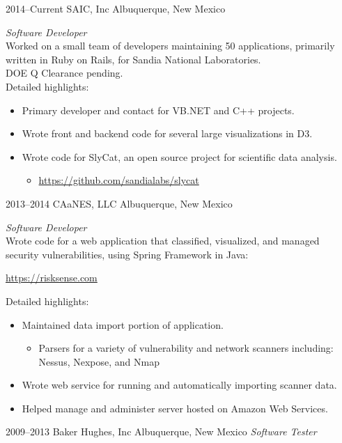 \documentclass[]{friggeri-cv} %
\begin{document}
\begin{entrylist}
\entry
{2014--Current}
{SAIC, Inc}
{Albuquerque, New Mexico}
{\emph{Software Developer} \\
Worked on a small team of developers maintaining 50 applications, primarily written in Ruby on Rails, for Sandia National Laboratories.\\
DOE Q Clearance pending. \\
Detailed highlights:
\begin{itemize}
\item Primary developer and contact for VB.NET and C++ projects.
\item Wrote front and backend code for several large visualizations in D3.
\item Wrote code for SlyCat, an open source project for scientific data analysis.
\begin{itemize}
		\item \href{https://github.com/sandialabs/slycat}{https://github.com/sandialabs/slycat}
\end{itemize}
\end{itemize}
}
\entry
{2013--2014}
{CAaNES, LLC}
{Albuquerque, New Mexico}
{\emph{Software Developer} \\
Wrote code for a web application that classified, visualized, and managed\\ security vulnerabilities, using Spring Framework in Java:
\begin{center}
	\href{https://risksense.com}{https://risksense.com}
\end{center}
Detailed highlights:
\begin{itemize}
\item Maintained data import portion of application.
\begin{itemize}
	\item Parsers for a variety of vulnerability and network scanners including: Nessus, Nexpose, and Nmap
\end{itemize}
\item Wrote web service for running and automatically importing scanner data.
\item Helped manage and administer server hosted on Amazon Web Services.
\end{itemize}}
\entry
{2009--2013}
{Baker Hughes, Inc}
{Albuquerque, New Mexico}
{\emph{Software Tester} \\
}
\end{entrylist}
\end{document}

